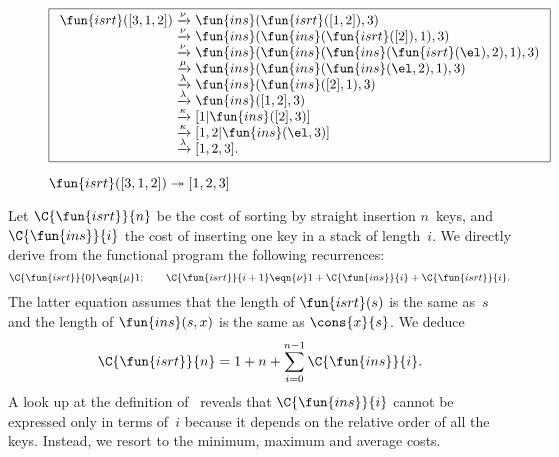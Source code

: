\begin{figure}
\begin{equation*}
\boxed{%
\begin{array}{r@{\;}l@{\;}l}
\fun{isrt}([3,1,2])
& \xrightarrow{\smash{\nu}} & \fun{ins}(\fun{isrt}([1,2]),3)\\
& \xrightarrow{\smash{\nu}}
& \fun{ins}(\fun{ins}(\fun{isrt}([2]),1),3)\\
& \xrightarrow{\smash{\nu}}
& \fun{ins}(\fun{ins}(\fun{ins}(\fun{isrt}(\el),2),1),3)\\
& \xrightarrow{\smash{\mu}}
& \fun{ins}(\fun{ins}(\fun{ins}(\el,2),1),3)\\
& \xrightarrow{\smash{\lambda}}
& \fun{ins}(\fun{ins}([2],1),3)\\
& \xrightarrow{\smash{\lambda}}
& \fun{ins}([1,2],3)\\
& \xrightarrow{\smash{\kappa}}
& [1|\fun{ins}([2],3)]\\
& \xrightarrow{\smash{\kappa}}
& [1,2|\fun{ins}(\el,3)]\\
& \xrightarrow{\smash{\lambda}}
& [1,2,3].
\end{array}}
\end{equation*}
\caption{\(\fun{isrt}([3,1,2]) \twoheadrightarrow [1,2,3]\)}
\label{fig:isrt_312}
\end{figure}

Let \(\C{\fun{isrt}}{n}\) be the cost
of sorting by straight insertion \(n\)~keys, and \(\C{\fun{ins}}{i}\)
the cost of inserting one key in a stack of length~\(i\). We directly
derive from the functional program the following recurrences:
\begin{equation*}
\C{\fun{isrt}}{0}   \eqn{\smash{\mu}} 1;\qquad
\C{\fun{isrt}}{i+1} \eqn{\smash{\nu}} 1 + \C{\fun{ins}}{i} +
  \C{\fun{isrt}}{i}.
\end{equation*}
The latter equation assumes that the length of \(\fun{isrt}(s)\) is
the same as~\(s\) and the length of \(\fun{ins}(s,x)\) is the same as
\(\cons{x}{s}\). We deduce
\begin{equation}
\C{\fun{isrt}}{n} = 1 + n + \sum_{i=0}^{n-1}\C{\fun{ins}}{i}.
\label{eq:cost_isrt}
\end{equation}
A look up at the definition of~ reveals that
\(\C{\fun{ins}}{i}\) cannot be expressed only in terms of~\(i\)
because it depends on the relative order of all the keys. Instead, we
resort to the minimum, maximum and average
costs.


